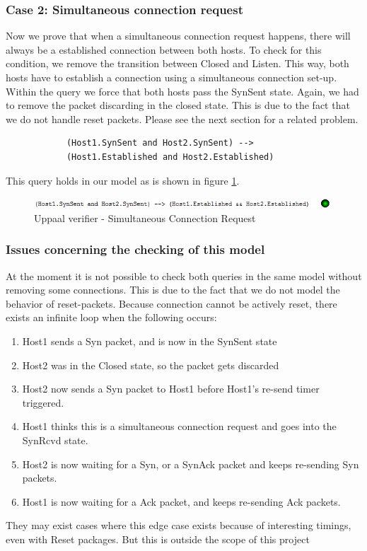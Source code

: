 \documentclass[twocolumn]{article}
\begin{document}
		\subsubsection{Case 2: Simultaneous connection request}
		Now we prove that when a simultaneous connection request happens, there will always be a established connection between both hosts. To check for this condition, we remove the transition between Closed and Listen. This way, both hosts have to establish a connection using a simultaneous connection set-up. Within the query we force that both hosts pass the SynSent state. Again, we had to remove the packet discarding in the closed state. This is due to the fact that we do not handle reset packets. Please see the next section for a related problem.
		\begin{verbatim}
			(Host1.SynSent and Host2.SynSent) -->
			(Host1.Established and Host2.Established)
		\end{verbatim}
		This query holds in our model as is shown in figure \ref{fig:verifier3}.
		\begin{figure}[h!]
			\begin{center}
				\includegraphics[width=\linewidth]{verifier-simul.png}
			\end{center}
			\caption{Uppaal verifier - Simultaneous Connection Request}
			\label{fig:verifier3}
		\end{figure}
		
		\subsubsection{Issues concerning the checking of this model}
		At the moment it is not possible to check both queries in the same model without removing some connections. This is due to the fact that we do not model the behavior of reset-packets. Because connection cannot be actively reset, there exists an infinite loop when the following occurs:
		\begin{enumerate}
			\item Host1 sends a Syn packet, and is now in the SynSent state
			\item Host2 was in the Closed state, so the packet gets discarded
			\item Host2 now sends a Syn packet to Host1 before Host1's re-send timer triggered.
			\item Host1 thinks this is a simultaneous connection request and goes into the SynRcvd state. 
			\item Host2 is now waiting for a Syn, or a SynAck packet and keeps re-sending Syn packets.
			\item Host1 is now waiting for a Ack packet, and keeps re-sending Ack packets.
		\end{enumerate}
		They may exist cases where this edge case exists because of interesting timings, even with Reset packages. But this is outside the scope of this project
	
\end{document}

